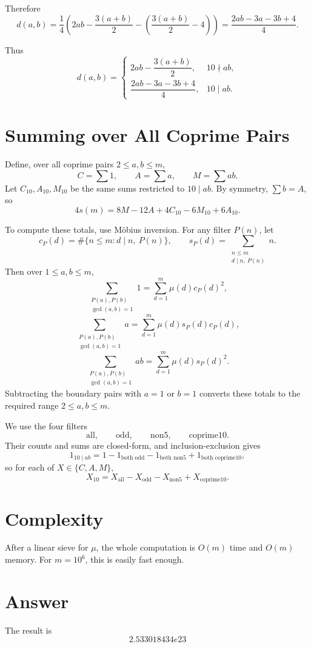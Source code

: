 \documentclass[11pt]{article}
\begin{document}
Therefore
\[
d(a,b)
=
\frac{1}{4}
\left(
2ab-\frac{3(a+b)}{2}
-\left(\frac{3(a+b)}{2}-4\right)
\right)
=
\frac{2ab-3a-3b+4}{4}.
\]

Thus
\[
d(a,b)=
\begin{cases}
2ab-\dfrac{3(a+b)}{2}, & 10\nmid ab,\\[1.2ex]
\dfrac{2ab-3a-3b+4}{4}, & 10\mid ab.
\end{cases}
\]

\section{Summing over All Coprime Pairs}

Define, over all coprime pairs $2\le a,b\le m$,
\[
C=\sum 1,\qquad A=\sum a,\qquad M=\sum ab.
\]
Let $C_{10},A_{10},M_{10}$ be the same sums restricted to $10\mid ab$.
By symmetry, $\sum b=A$, so
\[
4s(m)=8M-12A+4C_{10}-6M_{10}+6A_{10}.
\]

To compute these totals, use Möbius inversion. For any filter $P(n)$, let
\[
c_P(d)=\#\{n\le m: d\mid n,\ P(n)\},
\qquad
s_P(d)=\sum_{\substack{n\le m\\ d\mid n,\ P(n)}} n.
\]
Then over $1\le a,b\le m$,
\[
\sum_{\substack{P(a),P(b)\\ \gcd(a,b)=1}} 1
=\sum_{d=1}^{m}\mu(d)c_P(d)^2,
\]
\[
\sum_{\substack{P(a),P(b)\\ \gcd(a,b)=1}} a
=\sum_{d=1}^{m}\mu(d)s_P(d)c_P(d),
\]
\[
\sum_{\substack{P(a),P(b)\\ \gcd(a,b)=1}} ab
=\sum_{d=1}^{m}\mu(d)s_P(d)^2.
\]
Subtracting the boundary pairs with $a=1$ or $b=1$ converts these totals to the required range $2\le a,b\le m$.

We use the four filters
\[
\text{all},\qquad \text{odd},\qquad \text{non5},\qquad \text{coprime10}.
\]
Their counts and sums are closed-form, and inclusion-exclusion gives
\[
1_{10\mid ab}
=1-1_{\text{both odd}}-1_{\text{both non5}}+1_{\text{both coprime10}},
\]
so for each of $X\in\{C,A,M\}$,
\[
X_{10}=X_{\text{all}}-X_{\text{odd}}-X_{\text{non5}}+X_{\text{coprime10}}.
\]

\section{Complexity}

After a linear sieve for $\mu$, the whole computation is $O(m)$ time and $O(m)$ memory.
For $m=10^6$, this is easily fast enough.

\section{Answer}

The result is
\[
\boxed{2.533018434e23}
\]
\end{document}
